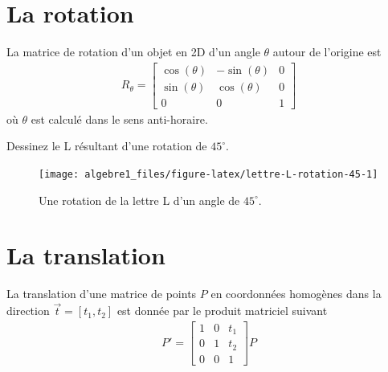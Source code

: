 \documentclass[]{book}
\theoremstyle{definition}
\theoremstyle{definition}
\theoremstyle{definition}
\theoremstyle{remark}
\let\BeginKnitrBlock\begin \let\EndKnitrBlock\end
\begin{document}
\hypertarget{la-rotation}{%
\section{La rotation}\label{la-rotation}}

\BeginKnitrBlock{definition}
\protect\hypertarget{def:unnamed-chunk-257}{}{\label{def:unnamed-chunk-257} }La matrice de rotation d'un objet en 2D d'un angle \(\theta\) autour de l'origine est
\begin{align*}
    R_{\theta}=\begin{bmatrix}
        \cos(\theta) & -\sin(\theta)&0 \\
        \sin(\theta) & \cos(\theta)&0\\
        0&0&1
    \end{bmatrix}
\end{align*}
où \(\theta\) est calculé dans le sens anti-horaire.
\EndKnitrBlock{definition}

\BeginKnitrBlock{example}
\protect\hypertarget{exm:unnamed-chunk-258}{}{\label{exm:unnamed-chunk-258} }Dessinez le L résultant d'une rotation de \(45^{\circ}\).
\EndKnitrBlock{example}

\begin{figure}

{\centering \texttt{[image: algebre1\_files/figure-latex/lettre-L-rotation-45-1]} 

}

\caption{Une rotation de la lettre L d'un angle de $45^{\circ}$.}\label{fig:lettre-L-rotation-45}
\end{figure}

\hypertarget{la-translation}{%
\section{La translation}\label{la-translation}}

\BeginKnitrBlock{definition}
\protect\hypertarget{def:unnamed-chunk-259}{}{\label{def:unnamed-chunk-259} }La translation d'une matrice de points \(P\) en coordonnées homogènes dans la direction \(\overrightarrow{t}=[t_1,t_2]\) est donnée par le produit matriciel suivant
\begin{align*}
P'=\begin{bmatrix}
        1 & 0 &t_1\\
        0 & 1 &t_2\\
        0&0&1
    \end{bmatrix}P
\end{align*}
\EndKnitrBlock{definition}
\end{document}
